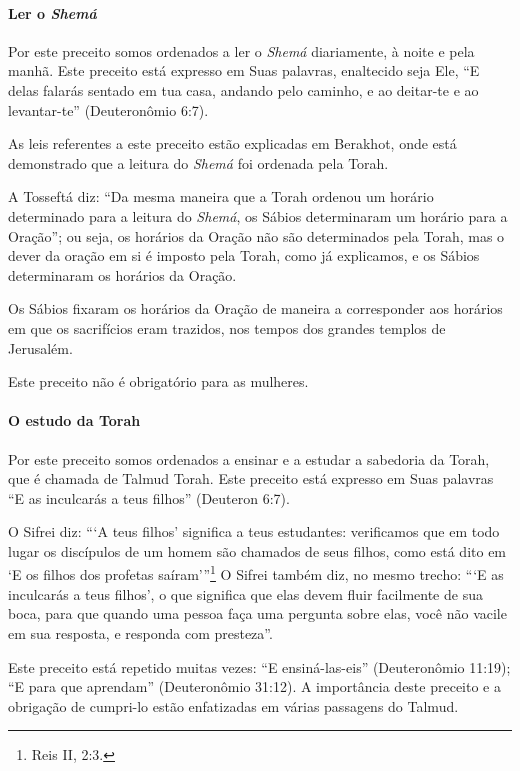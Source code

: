 \paragraph{Ler o \textit{Shemá}}

Por este preceito somos ordenados a ler o \textit{Shemá} diariamente, à noite e
pela manhã. Este preceito está expresso em Suas palavras, enaltecido
seja Ele, ``E delas falarás sentado em tua casa, andando pelo caminho, e
ao deitar-te e ao levantar-te'' (Deuteronômio 6:7).

As leis referentes a este preceito estão explicadas em Berakhot, onde
está demonstrado que a leitura do \textit{Shemá} foi ordenada pela Torah.

A Tosseftá diz: ``Da mesma maneira que a Torah ordenou um horário
determinado para a leitura do \textit{Shemá}, os Sábios determinaram um horário
para a Oração''; ou seja, os horários da Oração não são determinados
pela Torah, mas o dever da oração em si é imposto pela Torah, como já
explicamos, e os Sábios determinaram os horários da Oração.

Os Sábios fixaram os horários da Oração de maneira a corresponder aos
horários em que os sacrifícios eram trazidos, nos tempos dos grandes
templos de Jerusalém.

Este preceito não é obrigatório para as mulheres.

\paragraph{O estudo da Torah}

Por este preceito somos ordenados a ensinar e a estudar a sabedoria da
Torah, que é chamada de Talmud Torah. Este preceito está expresso em
Suas palavras ``E as inculcarás a teus filhos'' (Deuteron 6:7).

O Sifrei diz: ```A teus filhos' significa a teus estudantes: verificamos
que em todo lugar os discípulos de um homem são chamados de seus filhos,
como está dito em `E os filhos dos profetas saíram'''\footnote{Reis II, 2:3.} O Sifrei também diz,
no mesmo trecho: ```E as inculcarás a teus filhos', o que significa que
elas devem fluir facilmente de sua boca, para que quando uma pessoa faça uma
pergunta sobre elas, você não vacile em sua resposta, e responda com
presteza''.

Este preceito está repetido muitas vezes: ``E ensiná-las-eis''
(Deuteronômio 11:19); ``E para que aprendam'' (Deuteronômio 31:12). A
importância deste preceito e a obrigação de cumpri-lo estão enfatizadas
em várias passagens do Talmud.

